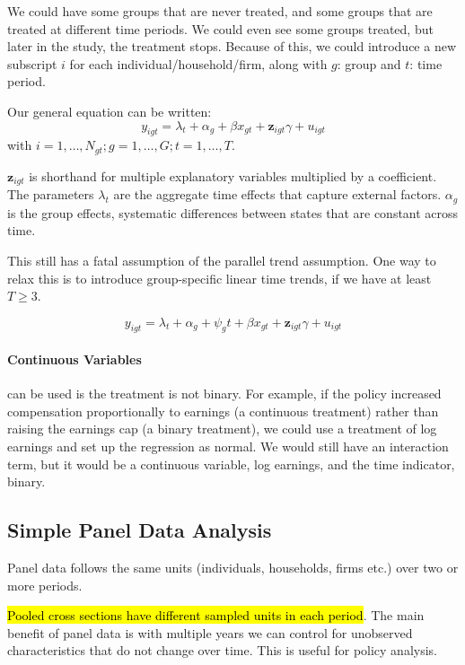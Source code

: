 \documentclass[11pt]{article}
\begin{document}
We could have some groups that are never treated, and some groups that are treated at different time periods. We could even see some groups treated, but later in the study, the treatment stops. Because of this, we could introduce a new subscript $i$ for each individual/household/firm, along with $g$: group and $t$: time period.

Our general equation can be written:
\[y_{igt} = \lambda_t + \alpha_g + \beta x_{gt} + \boldsymbol{z}_{igt}\gamma + u_{igt}\]
with $i= 1,\ldots, N_{gt}; g= 1, \ldots, G; t= 1,\ldots, T$.

$\boldsymbol{z}_{igt}$ is shorthand for multiple explanatory variables multiplied by a coefficient. The parameters $\lambda_t$ are the aggregate time effects that capture external factors. $\alpha_g$ is the group effects, systematic differences between states that are constant across time.

This still has a fatal assumption of the parallel trend assumption. One way to relax this is to introduce group-specific linear time trends, if we have at least $T\geq 3$.

\[y_{igt} = \lambda_t + \alpha_g + \psi_g t + \beta x_{gt} + \boldsymbol{z}_{igt}\gamma + u_{igt}\]




\paragraph{Continuous Variables} can be used is the treatment is not binary. For example, if the policy increased compensation proportionally to earnings (a continuous treatment) rather than raising the earnings cap (a binary treatment), we could use a treatment of log earnings and set up the regression as normal. We would still have an interaction term, but it would be a continuous variable, log earnings, and the time indicator, binary.



\subsection{Simple Panel Data Analysis}

Panel data follows the same units (individuals, households, firms etc.) over two or more periods.

\hl{Pooled cross sections have different sampled units in each period}. The main benefit of panel data is with multiple years we can control for unobserved characteristics that do not change over time. This is useful for policy analysis.
\end{document}
